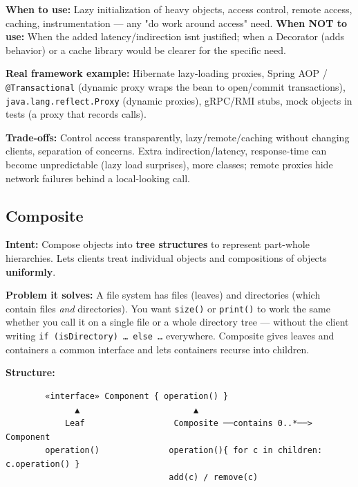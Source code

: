 \documentclass[11pt]{article}
\begin{document}
\textbf{When to use:} Lazy initialization of heavy objects, access control, remote access, caching, instrumentation --- any "do work around access" need. \textbf{When NOT to use:} When the added latency/indirection isn\textquotesingle t justified; when a Decorator (adds behavior) or a cache library would be clearer for the specific need.

\textbf{Real framework example:} Hibernate lazy-loading proxies, Spring AOP / \texttt{@Transactional} (dynamic proxy wraps the bean to open/commit transactions), \texttt{java.lang.reflect.Proxy} (dynamic proxies), gRPC/RMI stubs, mock objects in tests (a proxy that records calls).

\textbf{Trade-offs:} Control access transparently, lazy/remote/caching without changing clients, separation of concerns. Extra indirection/latency, response-time can become unpredictable (lazy load surprises), more classes; remote proxies hide network failures behind a local-looking call.

\subsection{Composite}\label{composite}

\textbf{Intent:} Compose objects into \textbf{tree structures} to represent part-whole hierarchies. Lets clients treat individual objects and compositions of objects \textbf{uniformly}.

\textbf{Problem it solves:} A file system has files (leaves) and directories (which contain files \emph{and} directories). You want \texttt{size()} or \texttt{print()} to work the same whether you call it on a single file or a whole directory tree --- without the client writing \texttt{if\ (isDirectory)\ …\ else\ …} everywhere. Composite gives leaves and containers a common interface and lets containers recurse into children.

\textbf{Structure:}

\setcodelang{}

\begin{verbatim}
        «interface» Component { operation() }
              ▲                       ▲
            Leaf                  Composite ──contains 0..*──> Component
        operation()              operation(){ for c in children: c.operation() }
                                 add(c) / remove(c)
\end{verbatim}

\end{document}
